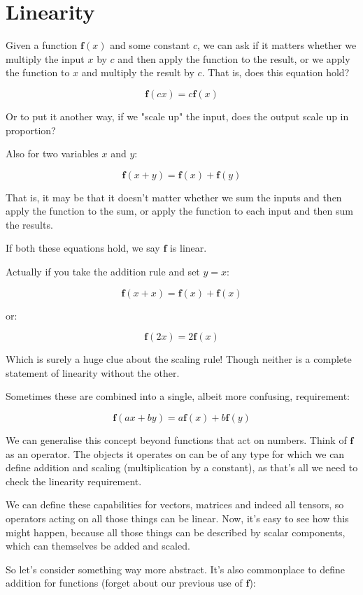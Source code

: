 \chapter{Linearity} \label{ch:linearity}

Given a function $\mathbf{f}(x)$ and some constant $c$, we can ask if it matters whether we multiply the input $x$ by $c$ and then apply the function to the result, or we apply the function to $x$ and multiply the result by $c$. That is, does this equation hold?

$$\mathbf{f}(cx) = c\mathbf{f}(x)$$

Or to put it another way, if we "scale up" the input, does the output scale up in proportion?

Also for two variables $x$ and $y$:

$$\mathbf{f}(x + y) = \mathbf{f}(x) + \mathbf{f}(y)$$

That is, it may be that it doesn't matter whether we sum the inputs and then apply the function to the sum, or apply the function to each input and then sum the results.

If both these equations hold, we say $\mathbf{f}$ is linear.

Actually if you take the addition rule and set $y = x$:

$$\mathbf{f}(x + x) = \mathbf{f}(x) + \mathbf{f}(x)$$

or:

$$\mathbf{f}(2x) = 2\mathbf{f}(x)$$

Which is surely a huge clue about the scaling rule! Though neither is a complete statement of linearity without the other.

Sometimes these are combined into a single, albeit more confusing, requirement:

$$\mathbf{f}(ax + by) = a\mathbf{f}(x) + b\mathbf{f}(y)$$

We can generalise this concept beyond functions that act on numbers. Think of $\mathbf{f}$ as an operator. The objects it operates on can be of any type for which we can define addition and scaling (multiplication by a constant), as that's all we need to check the linearity requirement.

We can define these capabilities for vectors, matrices and indeed all tensors, so operators acting on all those things can be linear. Now, it's easy to see how this might happen, because all those things can be described by scalar components, which can themselves be added and scaled.

So let's consider something way more abstract. It's also commonplace to define addition for functions (forget about our previous use of $\mathbf{f}$):

